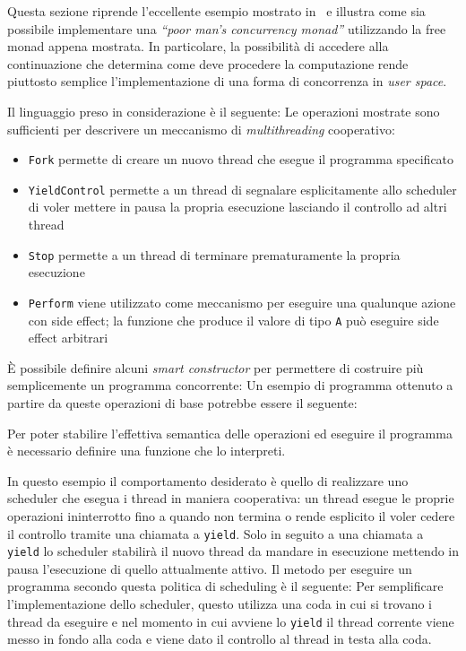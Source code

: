 Questa sezione riprende l'eccellente esempio mostrato in~\cite{cit:a-poor-mans-concurrency-monad} e illustra come sia possibile implementare una \emph{``poor man's concurrency monad''} utilizzando la free monad appena mostrata.
In particolare, la possibilità di accedere alla continuazione che determina come deve procedere la computazione rende piuttosto semplice l'implementazione di una forma di concorrenza in \emph{user space}.

Il linguaggio preso in considerazione è il seguente:
Le operazioni mostrate sono sufficienti per descrivere un meccanismo di \emph{multithreading} cooperativo:
\begin{itemize}
  \item \lstinline{Fork} permette di creare un nuovo thread che esegue il programma specificato
  \item \lstinline{YieldControl} permette a un thread di segnalare esplicitamente allo scheduler di voler mettere in pausa la propria esecuzione lasciando il controllo ad altri thread
  \item \lstinline{Stop} permette a un thread di terminare prematuramente la propria esecuzione
  \item \lstinline{Perform} viene utilizzato come meccanismo per eseguire una qualunque azione con side effect; la funzione che produce il valore di tipo \lstinline{A} può eseguire side effect arbitrari
\end{itemize}

È possibile definire alcuni \emph{smart constructor} per permettere di costruire più semplicemente un programma concorrente:
Un esempio di programma ottenuto a partire da queste operazioni di base potrebbe essere il seguente:

Per poter stabilire l'effettiva semantica delle operazioni ed eseguire il programma è necessario definire una funzione che lo interpreti.

In questo esempio il comportamento desiderato è quello di realizzare uno scheduler che esegua i thread in maniera cooperativa: un thread esegue le proprie operazioni ininterrotto fino a quando non termina o rende esplicito il voler cedere il controllo tramite una chiamata a \lstinline{yield}. Solo in seguito a una chiamata a \lstinline{yield} lo scheduler stabilirà il nuovo thread da mandare in esecuzione mettendo in pausa l'esecuzione di quello attualmente attivo.
Il metodo per eseguire un programma secondo questa politica di scheduling è il seguente:
Per semplificare l'implementazione dello scheduler, questo utilizza una coda in cui si trovano i thread da eseguire e nel momento in cui avviene lo \lstinline{yield} il thread corrente viene messo in fondo alla coda e viene dato il controllo al thread in testa alla coda.


